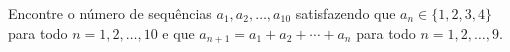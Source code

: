 Encontre o número de sequências $a_1, a_2 , \dots, a_{10}$ satisfazendo que $a_n \in \{1, 2, 3, 4\}$ para todo $n = 1, 2, \dots , 10$ e que $a_{n+1} = a_1 + a_2 + \cdots + a_n$ para todo $n = 1, 2, \dots, 9$.
